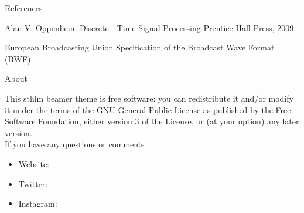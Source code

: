 \documentclass[newPxFont,numfooter,sectionpages]{beamer}
\begin{document}
    \begin{frame}{References}
        \begin{thebibliography}{10}
    
        \beamertemplatebookbibitems
        Alan V. Oppenheim
        \newblock Discrete - Time Signal Processing
        \newblock Prentice Hall Press, 2009
    
        \beamertemplatearticlebibitems
        European Broadcasting Union
        \newblock Specification of the Broadcast Wave Format (BWF)
    
      \end{thebibliography}
    \end{frame}
    
    
    \begin{frame}{About}
    
    This sthlm beamer theme is free software: you can redistribute it and/or modify
    it under the terms of the GNU General Public License as published by
    the Free Software Foundation, either version 3 of the License, or
    (at your option) any later version.\\
    \vspace{1cm}
    If you have any questions or comments
    \begin{itemize}
        \item Website: 
        \item Twitter: 
        \item Instagram: 
    \end{itemize}
    \end{frame}
    
    \begingroup
    \begin{frame}[plain]
    
    
    \end{frame}
    \endgroup
    
    
\end{document}
